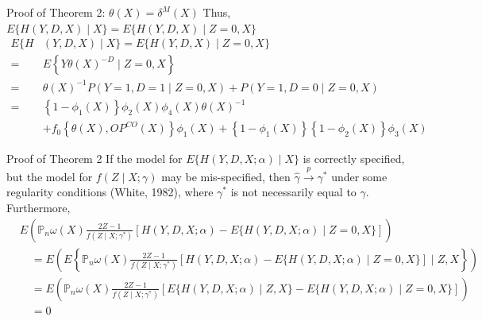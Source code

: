 \documentclass[aspectratio=169,xcolor=dvipsnames]{beamer}
\begin{document}
\begin{frame}{Proof of Theorem 2: $\theta(X)=\delta^{M}(X)$}
Thus, $E\{H(Y, D, X) \mid X\}=E\{H(Y, D, X) \mid Z=0, X\}$
$$
\begin{aligned}
E\{H&(Y, D, X) \mid X\}=E\{H(Y, D, X) \mid Z=0, X\} \\
=& E\left\{Y \theta(X)^{-D} \mid Z=0, X\right\} \\
=& \theta(X)^{-1} P(Y=1, D=1 \mid Z=0, X)+P(Y=1, D=0 \mid Z=0, X) \\
=&\left\{1-\phi_{1}(X)\right\} \phi_{2}(X) \phi_{4}(X) \theta(X)^{-1} \\
&+f_{0}\left\{\theta(X), O P^{C O}(X)\right\} \phi_{1}(X)+\left\{1-\phi_{1}(X)\right\}\left\{1-\phi_{2}(X)\right\} \phi_{3}(X)
\end{aligned}
$$
\end{frame}

\begin{frame}{Proof of Theorem 2}
If the model for $E\{H(Y, D, X ; \alpha) \mid X\}$ is correctly specified, but the model for $f(Z \mid X ; \gamma)$ may be mis-specified, then $\hat{\gamma} \stackrel{p}{\rightarrow} \gamma^{*}$ under some regularity conditions (White, 1982), where $\gamma^{*}$ is not necessarily equal to $\gamma$. Furthermore,
$$
\begin{aligned}
&E\left(\mathbb{P}_{n} \omega(X) \frac{2 Z-1}{f\left(Z \mid X ; \gamma^{*}\right)}[H(Y, D, X ; \alpha)-E\{H(Y, D, X ; \alpha) \mid Z=0, X\}]\right) \\
&\quad=E\left(E\left\{\mathbb{P}_{n} \omega(X) \frac{2 Z-1}{f\left(Z \mid X ; \gamma^{*}\right)}[H(Y, D, X ; \alpha)-E\{H(Y, D, X ; \alpha) \mid Z=0, X\}] \mid Z, X\right\}\right) \\
&\quad=E\left(\mathbb{P}_{n} \omega(X) \frac{2 Z-1}{f\left(Z \mid X ; \gamma^{*}\right)}[E\{H(Y, D, X ; \alpha) \mid Z, X\}-E\{H(Y, D, X ; \alpha) \mid Z=0, X\}]\right)\\
&\quad=0
\end{aligned}
$$
\end{frame}
\end{document}
